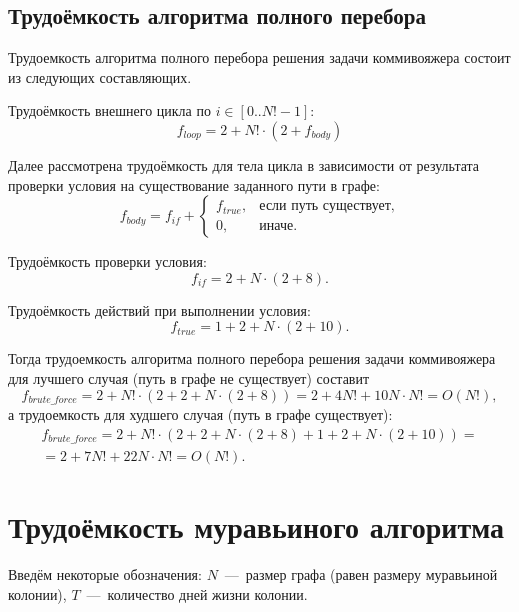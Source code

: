 \subsection{Трудоёмкость алгоритма полного перебора}

Трудоемкость алгоритма полного перебора решения задачи коммивояжера состоит из следующих составляющих.

Трудоёмкость внешнего цикла по $i \in [0..N!-1]$:
\begin{equation}
	f_{loop}= 2 + N! \cdot (2 + f_{body})
\end{equation}

Далее рассмотрена трудоёмкость для тела цикла в зависимости от результата проверки условия на существование заданного пути в графе:
\begin{equation}
  f_{body} = f_{if} + \begin{cases}
    f_{true}, & \text{если путь существует,}\\
    0, & \text{иначе.}
  \end{cases}
\end{equation}

Трудоёмкость проверки условия:
\begin{equation}
  f_{if} = 2 + N \cdot(2 + 8).
\end{equation}

Трудоёмкость действий при выполнении условия:
\begin{equation}
  f_{true} = 1 + 2 + N\cdot(2 + 10).
\end{equation}

Тогда трудоемкость алгоритма полного перебора решения задачи коммивояжера для лучшего случая (путь в графе не существует) составит
\begin{equation}
  f_{brute\_force} = 2 + N!\cdot(2 + 2 + N\cdot(2 + 8) ) = 2 + 4N! + 10N \cdot N! = O(N!),
\end{equation}
а трудоемкость для худшего случая (путь в графе существует):
\begin{equation}
\begin{aligned}
  f_{brute\_force} = 2 + N!\cdot(2 + 2 + N\cdot(2 + 8)  + 1 + 2 + N \cdot(2 + 10)) = \\ =2 + 7N! + 22N \cdot N! = O(N!).
\end{aligned}
\end{equation}

\section{Трудоёмкость муравьиного алгоритма}
Введём некоторые обозначения: $N$~---~размер графа (равен размеру муравьиной колонии), $T$~---~количество дней жизни колонии.

